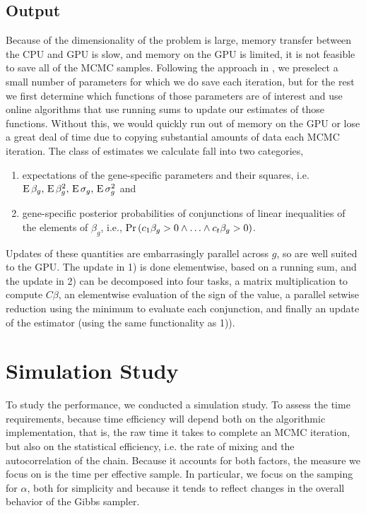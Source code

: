 

\subsection{Output}
\label{subsec:output}
Because of the dimensionality of the problem is large, memory transfer between the CPU and GPU is slow, and memory on the GPU is limited, it is not feasible to save all of the MCMC samples. Following the approach in \citet{landau2016fully}, we preselect a small number of parameters for which we do save each iteration, but for the rest we first determine which functions of those parameters are of interest and use online algorithms that use running sums to update our estimates of those functions. Without this, we would quickly run out of memory on the GPU or lose a great deal of time due to copying substantial amounts of data each MCMC iteration. The class of estimates we calculate fall into two categories,
\begin{enumerate}
\item expectations of the gene-specific parameters and their squares, i.e. $\operatorname{E} \beta_g,\, \operatorname{E} \beta_g^2,\, \operatorname{E}\sigma_g,\, \operatorname{E}\sigma_g^2$ and 
\item gene-specific posterior probabilities of conjunctions of linear
  inequalities of the elements of $\beta_g$, i.e.,
  $\operatorname{Pr}\left(c_1\beta_g > 0 \land \ldots \land c_t\beta_g > 0\right)$.
\end{enumerate}
Updates of these quantities are embarrasingly parallel across $g$, so are well suited to the GPU. The update in 1) is done elementwise, based on a running sum, and the update in 2) can be decomposed into four tasks, a matrix multiplication to compute $C\beta$, an elementwise evaluation of the sign of the value, a parallel setwise reduction using the minimum to evaluate each conjunction, and finally an update of the estimator (using the same functionality as 1)).



\section{Simulation Study}
To study the performance, we conducted a simulation study. To assess the time requirements, because time efficiency will depend both on the algorithmic implementation, that is, the raw time it takes to complete an MCMC iteration, but also on the statistical efficiency, i.e. the rate of mixing and the autocorrelation of the chain. Because it accounts for both factors, the measure we focus on is the time per effective sample. In particular, we focus on the samping for $\alpha$, both for simplicity and because it tends to reflect changes in the overall behavior of the Gibbs sampler.

